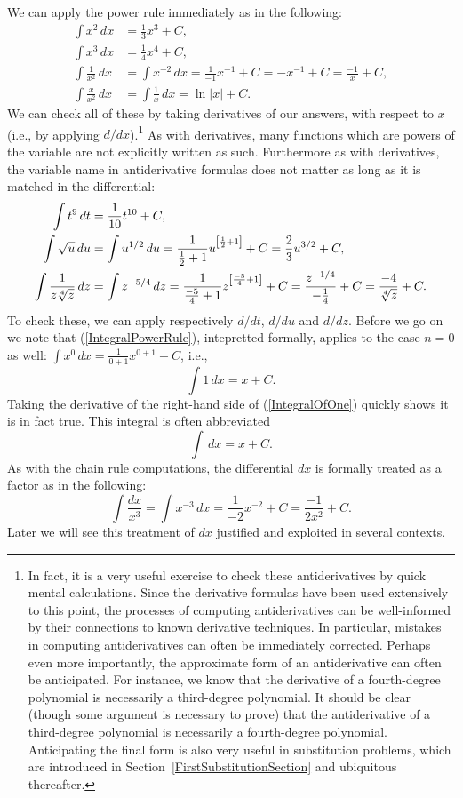 We can apply the power rule immediately
as in the following:
\begin{align*}
\int x^2\,dx&=\frac13x^3+C,\\
\int x^3\,dx&=\frac14x^4+C,\\
\int\frac1{x^2}\,dx&=\int x^{-2}\,dx=\frac1{-1}x^{-1}+C
=-x^{-1}+C=\frac{-1}x+C,\\
\int\frac{x}{x^2}\,dx&=\int\frac1x\,dx=\ln|x|+C.
\end{align*}
We can check all of these by taking derivatives of our answers,
with respect to $x$ (i.e., by applying $d/dx$).\footnote{
In fact, it is a very useful exercise to check these antiderivatives
by quick mental calculations.  Since the derivative formulas have
been used extensively to this point, the processes of computing
antiderivatives can be well-informed by their connections
to known derivative techniques.  In particular, mistakes in 
computing antiderivatives can often be immediately corrected.
Perhaps even more importantly, the approximate form of an antiderivative
can often be anticipated.  For instance, we know that the derivative
of a fourth-degree polynomial is necessarily a third-degree polynomial.
It should be clear (though some argument is necessary to prove) that
the antiderivative of a third-degree polynomial is necessarily a 
fourth-degree polynomial.  Anticipating the final form is also
very useful in substitution problems, which are introduced in 
Section~\ref{FirstSubstitutionSection} and ubiquitous thereafter.
}
As with derivatives, many functions which are powers of the variable are
not explicitly written as such.  Furthermore as with derivatives,
the variable name in antiderivative formulas does not matter as long as 
it is matched in the differential:
\begin{align*}
\int t^9\,dt&=\frac1{10}t^{10}+C,\\
\int \sqrt{u}\,du&=\int u^{1/2}\,du=\frac1{\frac12+1}u
             {\vphantom{X^X}}^{\left[\frac12+1\right]}
    +C=\frac23u^{3/2}+C,\\
\int\frac{1}{z\sqrt[4]z}\,dz&=\int z^{-5/4}\,dz
   =\frac1{\frac{-5}4+1}z{\vphantom{X^X}}^{\left[\frac{-5}4+1\right]}+C
   =\frac{z^{-1/4}}{-\frac14}+C=\frac{-4}{\sqrt[4]{z}}+C.
\end{align*}
To check these, we can apply respectively $d/dt$, $d/du$ and
$d/dz$.  
Before we go on we note that (\ref{IntegralPowerRule}),
intepretted formally, applies to the case $n=0$ as well:
$\int x^0\,dx=\frac{1}{0+1}x^{0+1}+C$, i.e.,
\begin{equation}\int 1\,dx=x+C.\label{IntegralOfOne}\end{equation}
Taking the derivative of the right-hand side of 
(\ref{IntegralOfOne}) quickly shows it is in fact true.
This integral is often abbreviated
\begin{equation}\int\,dx=x+C.\label{IntegralOf_dx}\end{equation}
As with the chain rule computations, the differential $dx$
is formally treated as a factor as in the following:\label{UsingdxAsAFactor}
$$\int\frac{dx}{x^3}=\int x^{-3}\,dx=\frac{1}{-2}x^{-2}+C
=\frac{-1}{2x^2}+C.$$
Later we will see this treatment of $dx$ justified and exploited
in several contexts.

